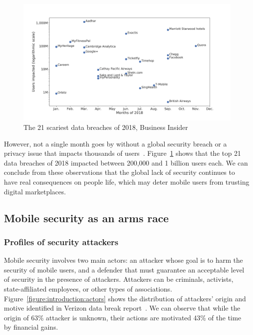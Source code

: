 \begin{figure}[!ht]
        \centering
	\includegraphics[width=\linewidth]{figures/introduction/breaches.pdf}
        \caption[The 21 scariest data breaches of 2018]{The 21 scariest data breaches of 2018, Business Insider~\cite{leskin_21_2018}}
	\label{figure:introduction:breaches}
\end{figure}

However, not a single month goes by without a global security breach or a privacy issue that impacts thousands of users~\cite{leskin_21_2018}.
Figure~\ref{figure:introduction:breaches} shows that the top 21 data breaches of 2018 impacted between 200,000 and 1 billion users each.
We can conclude from these observations that the global lack of security continues to have real consequences on people life, which may deter mobile users from trusting digital marketplaces.
\subsection{Mobile security as an arms race}
\subsubsection{Profiles of security attackers}
Mobile security involves two main actors: an attacker whose goal is to harm the security of mobile users, and a defender that must guarantee an acceptable level of security in the presence of attackers.
Attackers can be criminals, activists, state-affiliated employees, or other types of associations.
Figure~\ref{figure:introduction:actors} shows the distribution of attackers' origin and motive identified in Verizon data break report~\cite{verizon_2018_2019}.
We can observe that while the origin of 63\% attacker is unknown, their actions are motivated 43\% of the time by financial gains.

